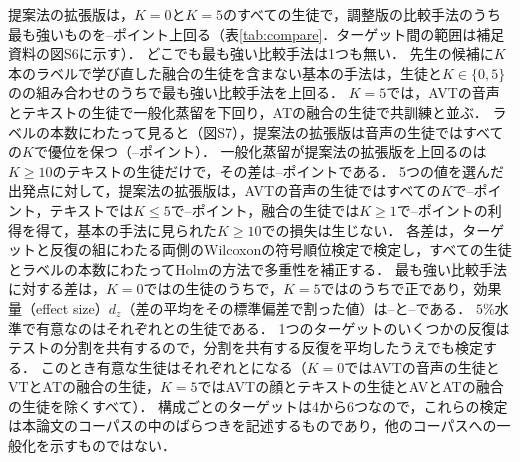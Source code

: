 提案法の拡張版は，$K=0$と$K=5$のすべての生徒で，調整版の比較手法のうち最も強いものを--ポイント上回る（表\ref{tab:compare}．ターゲット間の範囲は補足資料の図S6に示す）．
どこでも最も強い比較手法は1つも無い．
先生の候補に$K$本のラベルで学び直した融合の生徒を含まない基本の手法は，生徒と$K \in \{0, 5\}$のの組み合わせのうちで最も強い比較手法を上回る．
$K=5$では，AVTの音声とテキストの生徒で一般化蒸留を下回り，ATの融合の生徒で共訓練と並ぶ．
ラベルの本数にわたって見ると（図S7），提案法の拡張版は音声の生徒ではすべての$K$で優位を保つ（--ポイント）．
一般化蒸留が提案法の拡張版を上回るのは$K \ge 10$のテキストの生徒だけで，その差は--ポイントである．
5つの値を選んだ出発点に対して，提案法の拡張版は，AVTの音声の生徒ではすべての$K$で--ポイント，テキストでは$K \le 5$で--ポイント，融合の生徒では$K \ge 1$で--ポイントの利得を得て，基本の手法に見られた$K \ge 10$での損失は生じない．
各差は，ターゲットと反復の組にわたる両側のWilcoxonの符号順位検定で検定し，すべての生徒とラベルの本数にわたってHolmの方法で多重性を補正する．
最も強い比較手法に対する差は，$K=0$ではの生徒のうちで，$K=5$ではのうちで正であり，効果量（effect size）$d_z$（差の平均をその標準偏差で割った値）は--と--である．
$5\%$水準で有意なのはそれぞれとの生徒である．
1つのターゲットのいくつかの反復はテストの分割を共有するので，分割を共有する反復を平均したうえでも検定する．
このとき有意な生徒はそれぞれとになる（$K=0$ではAVTの音声の生徒とVTとATの融合の生徒，$K=5$ではAVTの顔とテキストの生徒とAVとATの融合の生徒を除くすべて）．
構成ごとのターゲットは4から6つなので，これらの検定は本論文のコーパスの中のばらつきを記述するものであり，他のコーパスへの一般化を示すものではない．


